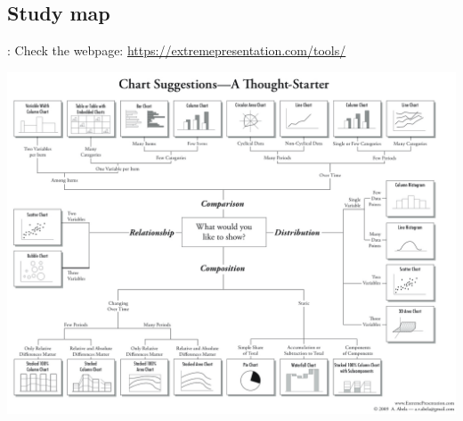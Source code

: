 \subsection{Study map}
\begin{frame}{\secname: \subsecname}
Check the webpage: \url{https://extremepresentation.com/tools/}
\vspace{-10pt}
\begin{center}
	\includegraphics[scale=0.35]{images/chart}
\end{center}

\end{frame}
